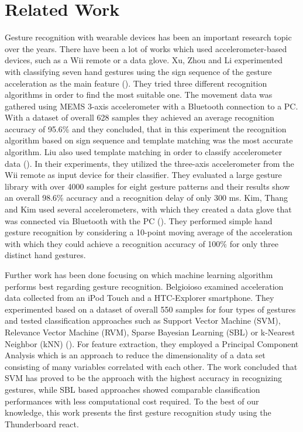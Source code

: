 
\chapter{Related Work}
\label{ch:Related Work}

Gesture recognition with wearable devices has been an important research topic over the years. 
There have been a lot of works which used accelerometer-based devices, such as a Wii remote or a data glove. 
Xu, Zhou and Li experimented with classifying seven hand gestures using the sign sequence of the gesture acceleration as the main feature (\cite{xu}). 
They tried three different recognition algorithms in order to find the most suitable one. 
The movement data was gathered using MEMS 3-axis accelerometer with a Bluetooth connection to a PC. 
With a dataset of overall 628 samples they achieved an average recognition accuracy of 95.6\% and they concluded, that in this experiment the recognition algorithm based on sign sequence and template matching was the most accurate algorithm. 
Liu also used template matching in order to classify accelerometer data (\cite{liu}). 
In their experiments, they utilized the three-axis accelerometer from the Wii remote as input device for their classifier. 
They evaluated a large gesture library with over 4000 samples for eight gesture patterns and their results show an overall 98.6\% accuracy and a recognition delay of only 300 ms. 
Kim, Thang and Kim used several accelerometers, with which they created a data glove that was connected via Bluetooth with the PC (\cite{kim}). 
They performed simple hand gesture recognition by considering a 10-point moving average of the acceleration with which they could achieve a recognition accuracy of 100\% for only three distinct hand gestures. 

Further work has been done focusing on which machine learning algorithm performs best regarding gesture recognition. 
Belgioioso examined acceleration data collected from an iPod Touch and a HTC-Explorer smartphone. 
They experimented based on a dataset of overall 550 samples for four types of gestures and tested classification approaches such as Support Vector Machine (SVM), Relevance Vector Machine (RVM), Sparse Bayesian Learning (SBL) or k-Nearest Neighbor (kNN) (\cite{belgioioso}). 
For feature extraction, they employed a Principal Component Analysis which is an approach to reduce the dimensionality of a data set consisting of many variables correlated with each other. 
The work concluded that SVM has proved to be the approach with the highest accuracy in recognizing gestures, while SBL based approaches showed comparable classification performances with less computational cost required.
To the best of our knowledge, this work presents the first gesture recognition study using the Thunderboard react.


